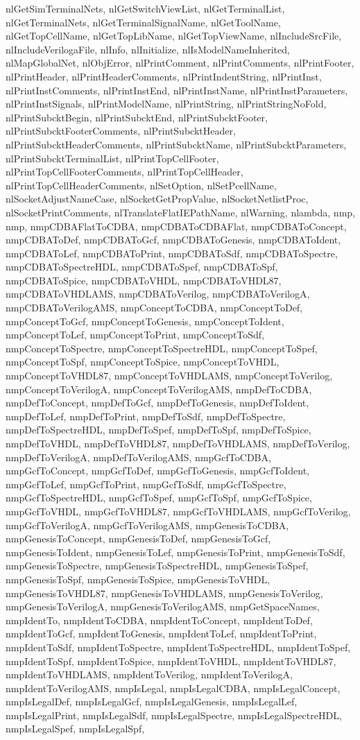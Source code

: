 {{nlGetSimTerminalNets, nlGetSwitchViewList, nlGetTerminalList, nlGetTerminalNets, nlGetTerminalSignalName, nlGetToolName, nlGetTopCellName, nlGetTopLibName, nlGetTopViewName, nlIncludeSrcFile, nlIncludeVerilogaFile, nlInfo, nlInitialize, nlIsModelNameInherited, nlMapGlobalNet, nlObjError, nlPrintComment, nlPrintComments, nlPrintFooter, nlPrintHeader, nlPrintHeaderComments, nlPrintIndentString, nlPrintInst, nlPrintInstComments, nlPrintInstEnd, nlPrintInstName, nlPrintInstParameters, nlPrintInstSignals, nlPrintModelName, nlPrintString, nlPrintStringNoFold, nlPrintSubcktBegin, nlPrintSubcktEnd, nlPrintSubcktFooter, nlPrintSubcktFooterComments, nlPrintSubcktHeader, nlPrintSubcktHeaderComments, nlPrintSubcktName, nlPrintSubcktParameters, nlPrintSubcktTerminalList, nlPrintTopCellFooter, nlPrintTopCellFooterComments, nlPrintTopCellHeader, nlPrintTopCellHeaderComments, nlSetOption, nlSetPcellName, nlSocketAdjustNameCase, nlSocketGetPropValue, nlSocketNetlistProc, nlSocketPrintComments, nlTranslateFlatIEPathName, nlWarning, nlambda, nmp, nmp, nmpCDBAFlatToCDBA, nmpCDBAToCDBAFlat, nmpCDBAToConcept, nmpCDBAToDef, nmpCDBAToGcf, nmpCDBAToGenesis, nmpCDBAToIdent, nmpCDBAToLef, nmpCDBAToPrint, nmpCDBAToSdf, nmpCDBAToSpectre, nmpCDBAToSpectreHDL, nmpCDBAToSpef, nmpCDBAToSpf, nmpCDBAToSpice, nmpCDBAToVHDL, nmpCDBAToVHDL87, nmpCDBAToVHDLAMS, nmpCDBAToVerilog, nmpCDBAToVerilogA, nmpCDBAToVerilogAMS, nmpConceptToCDBA, nmpConceptToDef, nmpConceptToGcf, nmpConceptToGenesis, nmpConceptToIdent, nmpConceptToLef, nmpConceptToPrint, nmpConceptToSdf, nmpConceptToSpectre, nmpConceptToSpectreHDL, nmpConceptToSpef, nmpConceptToSpf, nmpConceptToSpice, nmpConceptToVHDL, nmpConceptToVHDL87, nmpConceptToVHDLAMS, nmpConceptToVerilog, nmpConceptToVerilogA, nmpConceptToVerilogAMS, nmpDefToCDBA, nmpDefToConcept, nmpDefToGcf, nmpDefToGenesis, nmpDefToIdent, nmpDefToLef, nmpDefToPrint, nmpDefToSdf, nmpDefToSpectre, nmpDefToSpectreHDL, nmpDefToSpef, nmpDefToSpf, nmpDefToSpice, nmpDefToVHDL, nmpDefToVHDL87, nmpDefToVHDLAMS, nmpDefToVerilog, nmpDefToVerilogA, nmpDefToVerilogAMS, nmpGcfToCDBA, nmpGcfToConcept, nmpGcfToDef, nmpGcfToGenesis, nmpGcfToIdent, nmpGcfToLef, nmpGcfToPrint, nmpGcfToSdf, nmpGcfToSpectre, nmpGcfToSpectreHDL, nmpGcfToSpef, nmpGcfToSpf, nmpGcfToSpice, nmpGcfToVHDL, nmpGcfToVHDL87, nmpGcfToVHDLAMS, nmpGcfToVerilog, nmpGcfToVerilogA, nmpGcfToVerilogAMS, nmpGenesisToCDBA, nmpGenesisToConcept, nmpGenesisToDef, nmpGenesisToGcf, nmpGenesisToIdent, nmpGenesisToLef, nmpGenesisToPrint, nmpGenesisToSdf, nmpGenesisToSpectre, nmpGenesisToSpectreHDL, nmpGenesisToSpef, nmpGenesisToSpf, nmpGenesisToSpice, nmpGenesisToVHDL, nmpGenesisToVHDL87, nmpGenesisToVHDLAMS, nmpGenesisToVerilog, nmpGenesisToVerilogA, nmpGenesisToVerilogAMS, nmpGetSpaceNames, nmpIdentTo, nmpIdentToCDBA, nmpIdentToConcept, nmpIdentToDef, nmpIdentToGcf, nmpIdentToGenesis, nmpIdentToLef, nmpIdentToPrint, nmpIdentToSdf, nmpIdentToSpectre, nmpIdentToSpectreHDL, nmpIdentToSpef, nmpIdentToSpf, nmpIdentToSpice, nmpIdentToVHDL, nmpIdentToVHDL87, nmpIdentToVHDLAMS, nmpIdentToVerilog, nmpIdentToVerilogA, nmpIdentToVerilogAMS, nmpIsLegal, nmpIsLegalCDBA, nmpIsLegalConcept, nmpIsLegalDef, nmpIsLegalGcf, nmpIsLegalGenesis, nmpIsLegalLef, nmpIsLegalPrint, nmpIsLegalSdf, nmpIsLegalSpectre, nmpIsLegalSpectreHDL, nmpIsLegalSpef, nmpIsLegalSpf, }}

